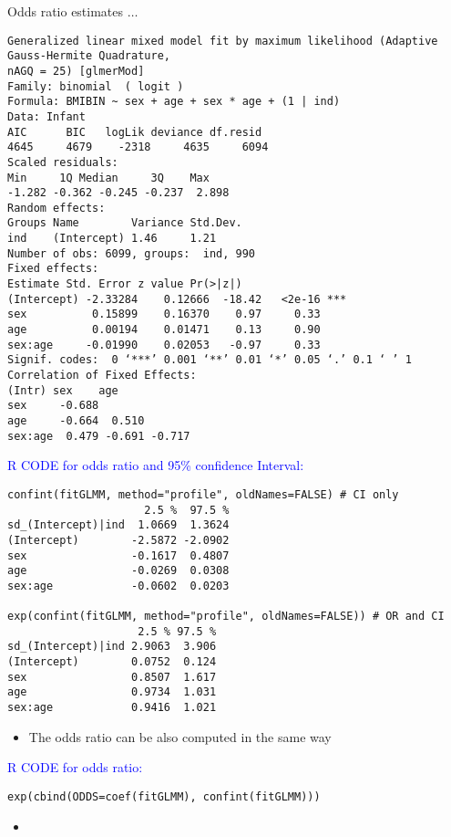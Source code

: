 \documentclass{beamer}
\begin{document}
\begin{frame}[fragile]
Odds ratio estimates $\ldots$
\scriptsize\begin{verbatim}
Generalized linear mixed model fit by maximum likelihood (Adaptive Gauss-Hermite Quadrature,
nAGQ = 25) [glmerMod]
Family: binomial  ( logit )
Formula: BMIBIN ~ sex + age + sex * age + (1 | ind)
Data: Infant
AIC      BIC   logLik deviance df.resid 
4645     4679    -2318     4635     6094 
Scaled residuals: 
Min     1Q Median     3Q    Max 
-1.282 -0.362 -0.245 -0.237  2.898 
Random effects:
Groups Name        Variance Std.Dev.
ind    (Intercept) 1.46     1.21    
Number of obs: 6099, groups:  ind, 990
Fixed effects:
Estimate Std. Error z value Pr(>|z|)    
(Intercept) -2.33284    0.12666  -18.42   <2e-16 ***
sex          0.15899    0.16370    0.97     0.33    
age          0.00194    0.01471    0.13     0.90    
sex:age     -0.01990    0.02053   -0.97     0.33    
Signif. codes:  0 ‘***’ 0.001 ‘**’ 0.01 ‘*’ 0.05 ‘.’ 0.1 ‘ ’ 1
Correlation of Fixed Effects:
(Intr) sex    age   
sex     -0.688              
age     -0.664  0.510       
sex:age  0.479 -0.691 -0.717

\end{verbatim}
\end{frame}

\begin{frame}[fragile]
\textcolor{blue}{R CODE for odds ratio and 95\% confidence Interval:}
\begin{verbatim}
confint(fitGLMM, method="profile", oldNames=FALSE) # CI only
                     2.5 %  97.5 %
sd_(Intercept)|ind  1.0669  1.3624
(Intercept)        -2.5872 -2.0902
sex                -0.1617  0.4807
age                -0.0269  0.0308
sex:age            -0.0602  0.0203

exp(confint(fitGLMM, method="profile", oldNames=FALSE)) # OR and CI 
                    2.5 % 97.5 %
sd_(Intercept)|ind 2.9063  3.906
(Intercept)        0.0752  0.124
sex                0.8507  1.617
age                0.9734  1.031
sex:age            0.9416  1.021
\end{verbatim}
\begin{itemize}
	\item The odds ratio can be also computed in the same way
\end{itemize}
\end{frame}




\begin{frame}[fragile]
\textcolor{blue}{R CODE for odds ratio:}
\begin{verbatim}
exp(cbind(ODDS=coef(fitGLMM), confint(fitGLMM)))
\end{verbatim}
\begin{itemize}
	\item 
\end{itemize}
\end{frame}
\end{document}
